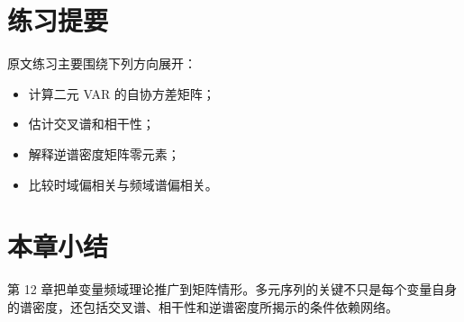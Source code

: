 \documentclass[11pt,a4paper]{ctexart}
\begin{document}
\section{练习提要}

原文练习主要围绕下列方向展开：
\begin{itemize}
  \item 计算二元 VAR 的自协方差矩阵；
  \item 估计交叉谱和相干性；
  \item 解释逆谱密度矩阵零元素；
  \item 比较时域偏相关与频域谱偏相关。
\end{itemize}

\section*{本章小结}

第 12 章把单变量频域理论推广到矩阵情形。多元序列的关键不只是每个变量自身的谱密度，还包括交叉谱、相干性和逆谱密度所揭示的条件依赖网络。
\end{document}
